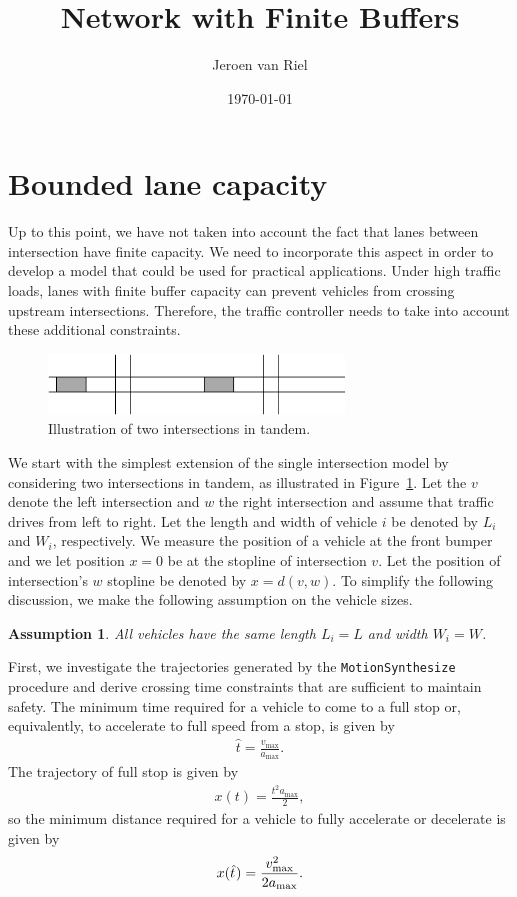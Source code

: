 \documentclass{article}
\title{Network with Finite Buffers}
\author{Jeroen van Riel}
\date{\monthyeardate\today}
\theoremstyle{definition}
\theoremstyle{plain}
\newtheorem{assump}{Assumption}
\begin{document}
\section*{Bounded lane capacity}

Up to this point, we have not taken into account the fact that lanes between
intersection have finite capacity. We need to incorporate this aspect in order
to develop a model that could be used for practical applications. Under high
traffic loads, lanes with finite buffer capacity can prevent vehicles from
crossing upstream intersections. Therefore, the traffic controller needs to take
into account these additional constraints.

\begin{figure}[h]
  \centering
  \includegraphics[width=0.7\textwidth]{figures/tandem.pdf}
  \caption{Illustration of two intersections in tandem.}\label{fig:tandem}
\end{figure}



We start with the simplest extension of the single intersection model by
considering two intersections in tandem, as illustrated in Figure~\ref{fig:tandem}. Let the
$v$ denote the left intersection and $w$ the right intersection and assume that
traffic drives from left to right. Let the length and width of vehicle $i$ be
denoted by $L_{i}$ and $W_{i}$, respectively. We measure the position of a
vehicle at the front bumper and we let position $x=0$ be at the stopline of
intersection $v$. Let the position of intersection's $w$ stopline be denoted by
$x=d(v,w)$. To simplify the following discussion, we make the following
assumption on the vehicle sizes.
\begin{assump}
  All vehicles have the same length $L_{i} = L$ and width
  $W_{i} = W$.
\end{assump}

First, we investigate the trajectories generated by the
\texttt{MotionSynthesize} procedure and derive crossing time constraints that
are sufficient to maintain safety.
%
The minimum time required for a vehicle to come to a full stop or, equivalently,
to accelerate to full speed from a stop, is given by
\begin{align*}
  \hat{t} = \frac{v_{\max}}{a_{\max}} .
\end{align*}
The trajectory of full stop is given by
\begin{align*}
  x(t) = \frac{t^{2} a_{\max}}{2} ,
\end{align*}
so the minimum distance required for a vehicle to fully accelerate or decelerate
is given by
\begin{align*}
  x(\hat{t} \hspace{0.06em}) = \frac{v_{\max}^{2}}{2 a_{\max}} .
\end{align*}
\end{document}
